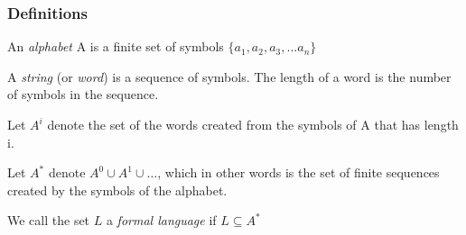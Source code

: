 \documentclass{beamer}
\newcommand{\alphabetSymbol}{A}
\newcommand{\alphabet}{\alphabetSymbol}
\newcommand{\alphabetpow}[1]{\alphabetSymbol^{#1}}
\newcommand{\languagesymbol}{L}
\begin{document}
\begin{frame}
	\frametitle{Definitions}
	\begin{definition}[Alphabet]
		An \emph{alphabet} \alphabet{} is a finite set of symbols $\{a_1, a_2, a_3, \ldots a_n\}$
	\end{definition}
	
	
	\begin{definition}[Words]
		A \emph{string} (or \emph{word}) is a sequence of symbols. The length of a word is the number of symbols in the sequence.
	\end{definition}
	
	
	\begin{definition}
		Let $\alphabetpow{i}$ denote the set of the words created from the symbols of \alphabet{} that has length i. 
		
		Let $\alphabetpow{*}$ denote $\alphabetSymbol^0 \cup \alphabetSymbol^1 \cup \ldots$, which in other words is the set of finite sequences created by the symbols of the alphabet.
	
		We call the set $ \languagesymbol{}$ a \emph{formal language} if $\languagesymbol{} \subseteq \alphabetpow{*}$
	\end{definition}
	
	
\end{frame}
\end{document}
